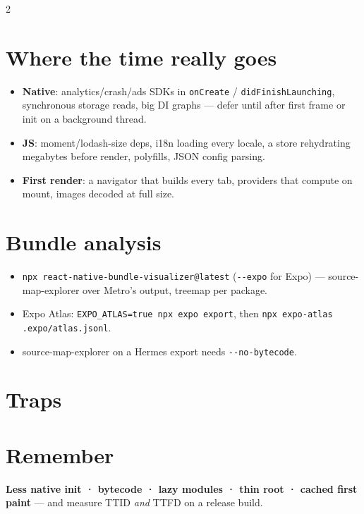 \documentclass[8pt]{extarticle}
\newcommand\dd{\hbox{-}\hbox{-}}
\begin{document}
\begin{multicols}{2}
\section{Where the time really goes}
\begin{itemize}\raggedright
  \item \textbf{Native}: analytics/crash/ads SDKs in \texttt{onCreate} /
        \texttt{didFinishLaunching}, synchronous storage reads, big DI graphs — defer
        until after first frame or init on a background thread.
  \item \textbf{JS}: moment/lodash-size deps, i18n loading every locale, a store rehydrating
        megabytes before render, polyfills, JSON config parsing.
  \item \textbf{First render}: a navigator that builds every tab, providers that compute
        on mount, images decoded at full size.
\end{itemize}

\section{Bundle analysis}
\begin{itemize}\raggedright
  \item \texttt{npx react-native-bundle-visualizer@latest} (\texttt{\dd{}expo} for Expo)
        — source-map-explorer over Metro's output, treemap per package.
  \item Expo Atlas: \texttt{EXPO\_ATLAS=true npx expo export}, then
        \texttt{npx expo-atlas .expo/atlas.jsonl}.
  \item source-map-explorer on a Hermes export needs \texttt{\dd{}no-bytecode}.
\end{itemize}

\section{Traps}
\begin{itemize}\raggedright
\end{itemize}

\section{Remember}
\textbf{Less native init · bytecode · lazy modules · thin root · cached first paint} —
and measure TTID \emph{and} TTFD on a release build.


\end{multicols}

\end{document}
